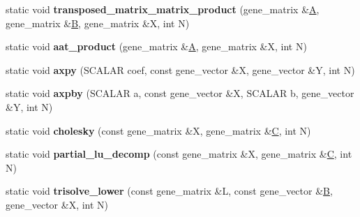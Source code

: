 \begin{DoxyCompactItemize}
static void {\bfseries transposed\+\_\+matrix\+\_\+matrix\+\_\+product} (gene\+\_\+matrix \&\hyperlink{group___core___module_class_eigen_1_1_matrix}{A}, gene\+\_\+matrix \&\hyperlink{group___core___module_class_eigen_1_1_matrix}{B}, gene\+\_\+matrix \&X, int N)
\item 
\mbox{\label{classblas__interface_3_01_s_c_a_l_a_r_01_4_a41eb9130a7271f2fce9e392b766211e4}} 
static void {\bfseries aat\+\_\+product} (gene\+\_\+matrix \&\hyperlink{group___core___module_class_eigen_1_1_matrix}{A}, gene\+\_\+matrix \&X, int N)
\item 
\mbox{\label{classblas__interface_3_01_s_c_a_l_a_r_01_4_a94ca3be1c2f513fb860997124461c434}} 
static void {\bfseries axpy} (S\+C\+A\+L\+AR coef, const gene\+\_\+vector \&X, gene\+\_\+vector \&Y, int N)
\item 
\mbox{\label{classblas__interface_3_01_s_c_a_l_a_r_01_4_a584063eb94416a3d5c58921e52a09584}} 
static void {\bfseries axpby} (S\+C\+A\+L\+AR a, const gene\+\_\+vector \&X, S\+C\+A\+L\+AR b, gene\+\_\+vector \&Y, int N)
\item 
\mbox{\label{classblas__interface_3_01_s_c_a_l_a_r_01_4_ac5bb21b4ec1ae490963c029b3d140bc6}} 
static void {\bfseries cholesky} (const gene\+\_\+matrix \&X, gene\+\_\+matrix \&\hyperlink{group___core___module}{C}, int N)
\item 
\mbox{\label{classblas__interface_3_01_s_c_a_l_a_r_01_4_a7ab98665ec1c05460a2dbe30eef28e41}} 
static void {\bfseries partial\+\_\+lu\+\_\+decomp} (const gene\+\_\+matrix \&X, gene\+\_\+matrix \&\hyperlink{group___core___module}{C}, int N)
\item 
\mbox{\label{classblas__interface_3_01_s_c_a_l_a_r_01_4_a923077f46be0f34cbf9ef79f9f06a479}} 
static void {\bfseries trisolve\+\_\+lower} (const gene\+\_\+matrix \&L, const gene\+\_\+vector \&\hyperlink{group___core___module_class_eigen_1_1_matrix}{B}, gene\+\_\+vector \&X, int N)
\item 
\mbox{\label{classblas__interface_3_01_s_c_a_l_a_r_01_4_a3868699604ea5c8263d817b0ce4841e3}} 

\end{DoxyCompactItemize}
